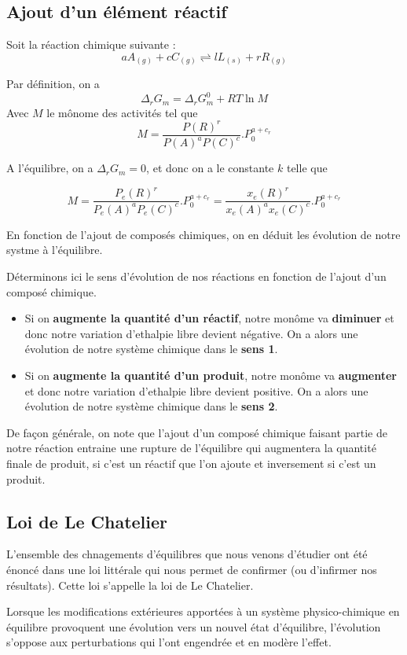 \subsection{Ajout d'un élément réactif}

Soit la réaction chimique suivante :
$$aA_{(g)}+cC_{(g)} \rightleftharpoons lL_{(s)}+rR_{(g)}$$


Par définition, on a 
$$\Delta_rG_m=\Delta_rG_m^0 + RT\ln M$$
Avec $M$ le mônome des activités tel que
$$M = \frac{P(R)^r}{P(A)^aP(C)^c}.P_0^{a+c_r}$$

A l'équilibre, on a $\Delta_rG_m=0$, et donc on a le constante $k$ telle que 

$$M = \frac{P_e(R)^r}{P_e(A)^aP_e(C)^c}.P_0^{a+c_r}=\frac{x_e(R)^r}{x_e(A)^ax_e(C)^c}.P_0^{a+c_r}$$

En fonction de l'ajout de composés chimiques, on en déduit les évolution de notre systme à l'équilibre.

\begin{proposition}
Déterminons ici le sens d'évolution de nos réactions en fonction de l'ajout d'un composé chimique.
\begin{itemize}
\item Si on \textbf{augmente la quantité d'un réactif}, notre monôme va \textbf{diminuer} et donc notre variation d'ethalpie libre devient négative. On a alors une évolution de notre système chimique dans le \textbf{sens 1}.
\item Si on \textbf{augmente la quantité d'un produit}, notre monôme va \textbf{augmenter} et donc notre variation d'ethalpie libre devient positive. On a alors une évolution de notre système chimique dans le \textbf{sens 2}.
\end{itemize}
\end{proposition}

\begin{remark}
De façon générale, on note que l'ajout d'un composé chimique faisant partie de notre réaction entraine une rupture de l'équilibre qui augmentera la quantité finale de produit, si c'est un réactif que l'on ajoute et inversement si c'est un produit.
\end{remark}

\subsection{Loi de Le Chatelier}

L'ensemble des chnagements d'équilibres que nous venons d'étudier ont été énoncé dans une loi littérale qui nous permet de confirmer (ou d'infirmer nos résultats). Cette loi s'appelle la loi de Le Chatelier.\\

\begin{theorem}
Lorsque les modifications extérieures apportées à un système physico-chimique en équilibre provoquent une évolution vers un nouvel état d'équilibre, l'évolution s'oppose aux perturbations qui l'ont engendrée et en modère l'effet.
\end{theorem}
